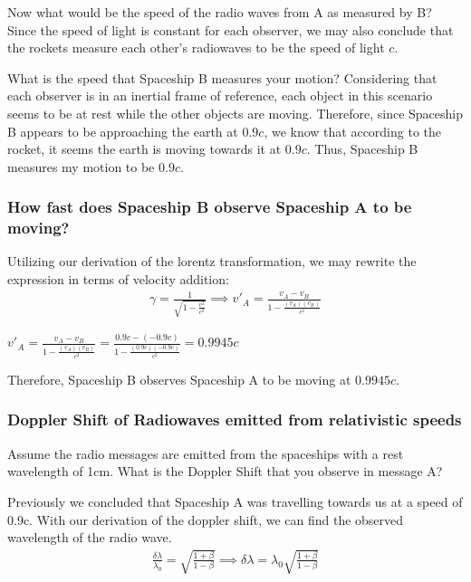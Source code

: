 \documentclass{article}
\begin{document}
Now what would be the speed of the radio waves from A as measured by B? Since the speed of light is constant for each observer, we may also conclude that the rockets measure each other's radiowaves to be the speed of light $c$.


What is the speed that Spaceship B measures your motion? Considering that each observer is in an inertial frame of reference, each object in this scenario seems to be at rest while the other objects are moving. Therefore, since Spaceship B appears to be approaching the earth at $0.9c$, we know that according to the rocket, it seems the earth is moving towards it at $0.9c$. Thus, Spaceship B measures my motion to be $0.9c$.

\subsubsection{How fast does Spaceship B observe Spaceship A to be moving?}

Utilizing our derivation of the lorentz transformation, we may rewrite the expression in terms of velocity addition: 
\begin{gather*}
\gamma = {\frac{1}{\sqrt{1 - \frac{v^2}{c^2}}}} \implies {v'}_A = \frac{v_A - v_B}{1 - \frac{(v_A)(v_B)}{c^2}} 
\end{gather*}
\begin{center}
	$\boxed{{v'}_A = \frac{v_A - v_B}{1 - \frac{(v_A)(v_B)}{c^2}} =  \frac{0.9c - (-0.9c)}{1 - \frac{(0.9c)(-0.9c)}{c^2}} = 0.9945c}
	$
\end{center}

Therefore, Spaceship B observes Spaceship A to be moving at $0.9945c$.
\subsubsection{Doppler Shift of Radiowaves emitted from relativistic speeds }


Assume the radio messages are emitted from the spaceships with a rest wavelength of 1cm. What is the Doppler Shift that you observe in message A? 

Previously we concluded that Spaceship A was travelling towards us at a speed of 0.9c. With our derivation of the doppler shift, we can find the observed wavelength of the radio wave.
\begin{gather*}
	\frac{\delta\lambda}{\lambda_0} = \sqrt{\frac{1+\beta}{1-\beta}} \implies 	\delta\lambda= \lambda_0\sqrt{\frac{1+\beta}{1-\beta}}
\end{gather*}
\end{document}
